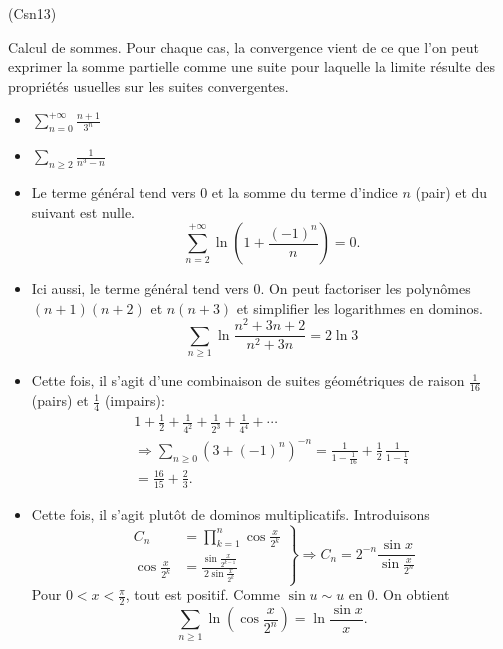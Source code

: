 \begin{tiny}(Csn13)\end{tiny} Calcul de sommes.\newline
Pour chaque cas, la convergence vient de ce que l'on peut exprimer la somme partielle comme une suite pour laquelle la limite résulte des propriétés usuelles sur les suites convergentes.

\begin{itemize}
  \item $\sum_{n=0}^{+\infty}\frac{n+1}{3^n}$
  \item $\sum_{n\geq 2} \frac{1}{n^3 - n}$
  \item Le terme général tend vers $0$ et la somme du terme d'indice $n$ (pair) et du suivant est nulle.
\[
 \sum_{n=2}^{+\infty}\ln\left( 1+\frac{(-1)^n}{n}\right) = 0.
\]

  \item Ici aussi, le terme général tend vers $0$. On peut factoriser les polynômes $(n+1)(n+2)$ et $n(n+3)$ et simplifier les logarithmes en dominos.
\[
\sum_{n\geq 1}\ln\frac{n^2+3n+2}{n^2+3n} = 2\ln 3 
\]

  \item Cette fois, il s'agit d'une combinaison de suites géométriques de raison $\frac{1}{16}$ (pairs) et $\frac{1}{4}$ (impairs):
\begin{multline*}
 1 + \frac{1}{2} + \frac{1}{4^2} + \frac{1}{2^3} + \frac{1}{4^4} + \cdots \\
 \Rightarrow 
\sum_{n\geq 0}\left( 3+(-1)^n\right)^{-n} = \frac{1}{1-\frac{1}{16}} + \frac{1}{2}\,\frac{1}{1-\frac{1}{4}}\\
= \frac{16}{15} + \frac{2}{3}.
\end{multline*}
  
  \item Cette fois, il s'agit plutôt de dominos multiplicatifs. Introduisons
\[
\left. 
\begin{aligned}
C_n &= \prod_{k=1}^{n}\cos \frac{x}{2^k} \\
\cos \frac{x}{2^k} & = \frac{\sin \frac{x}{2^{k-1}}}{2 \sin \frac{x}{2^{k}}}
\end{aligned}
\right\rbrace \Rightarrow
C_n = 2^{-n} \frac{\sin x}{\sin \frac{x}{2^{n}}}
\]
Pour $0< x < \frac{\pi}{2}$, tout est positif. Comme $\sin u \sim u$ en $0$. On obtient
\[
\sum_{n\geq 1}\ln(\cos\frac{x}{2^n}) = \ln \frac{\sin x}{x}. 
\]
 
\end{itemize}
